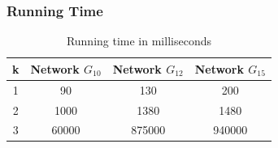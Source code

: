 \documentclass{beamer}
\begin{document}
\begin{frame}
\frametitle{Running Time}
\begin{table}[!htb]

   
      \centering
     \begin{tabular}{|c|c|c|c|}
     \hline
         k& Network $G_{10}$ & Network $G_{12}$ & Network $G_{15}$ \\
     \hline
     1&90& 130& 200 \\\hline
     2&1000 &1380&1480	\\\hline
3 &60000&875000&940000	 \\\hline
\end{tabular}
 \caption{Running time in milliseconds}
\label{Tab:runtym}
\end{table}

\end{frame}
\end{document}
